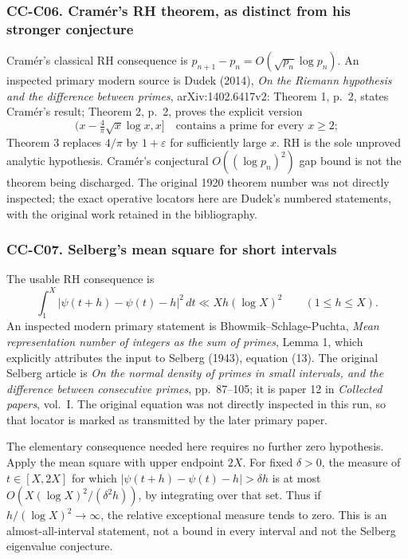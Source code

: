 \subsubsection{CC-C06. Cramér's RH theorem, as distinct from his
stronger
conjecture}\label{cc-c06.-cramuxe9rs-rh-theorem-as-distinct-from-his-stronger-conjecture}

Cramér's classical RH consequence is
\(p_{n+1}-p_n=O(\sqrt{p_n}\log p_n)\). An inspected primary modern
source is Dudek (2014), \emph{On the Riemann hypothesis and the
difference between primes}, arXiv:1402.6417v2: Theorem 1, p.~2, states
Cramér's result; Theorem 2, p.~2, proves the explicit version \[
 (x-\tfrac4\pi\sqrt x\log x,x]\quad\text{contains a prime for every }x\ge2;
\] Theorem 3 replaces \(4/\pi\) by \(1+\varepsilon\) for sufficiently
large \(x\). RH is the sole unproved analytic hypothesis. Cramér's
conjectural \(O((\log p_n)^2)\) gap bound is not the theorem being
discharged. The original 1920 theorem number was not directly inspected;
the exact operative locators here are Dudek's numbered statements, with
the original work retained in the bibliography.

\subsubsection{CC-C07. Selberg's mean square for short
intervals}\label{cc-c07.-selbergs-mean-square-for-short-intervals}

The usable RH consequence is \[
 \int_1^X|\psi(t+h)-\psi(t)-h|^2\,dt
 \ll Xh(\log X)^2\qquad(1\le h\le X).
\] An inspected modern primary statement is Bhowmik--Schlage-Puchta,
\emph{Mean representation number of integers as the sum of primes},
Lemma 1, which explicitly attributes the input to Selberg (1943),
equation (13). The original Selberg article is \emph{On the normal
density of primes in small intervals, and the difference between
consecutive primes}, pp.~87--105; it is paper 12 in \emph{Collected
papers}, vol.~I. The original equation was not directly inspected in
this run, so that locator is marked as transmitted by the later primary
paper.

The elementary consequence needed here requires no further zero
hypothesis. Apply the mean square with upper endpoint \(2X\). For fixed
\(\delta>0\), the measure of \(t\in[X,2X]\) for which
\(|\psi(t+h)-\psi(t)-h|>\delta h\) is at most
\(O(X(\log X)^2/(\delta^2h))\), by integrating over that set. Thus if
\(h/(\log X)^2\to\infty\), the relative exceptional measure tends to
zero. This is an almost-all-interval statement, not a bound in every
interval and not the Selberg eigenvalue conjecture.

